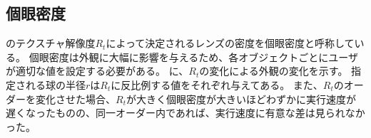 \newpage
\subsection{個眼密度}
\label{SSTexReso}

のテクスチャ解像度$R_t$によって決定されるレンズの密度を個眼密度と呼称している。
個眼密度は外観に大幅に影響を与えるため、各オブジェクトごとにユーザが適切な値を設定する必要がある。
に、$R_t$の変化による外観の変化を示す。
指定される球の半径$r$は$R_t$に反比例する値をそれぞれ与えてある。
また、$R_t$のオーダーを変化させた場合、$R_t$が大きく個眼密度が大きいほどわずかに実行速度が遅くなったものの、同一オーダー内であれば、実行速度に有意な差は見られなかった。

\begin{figure}[htbp]
  \centering
{}
\\
\end{figure}
